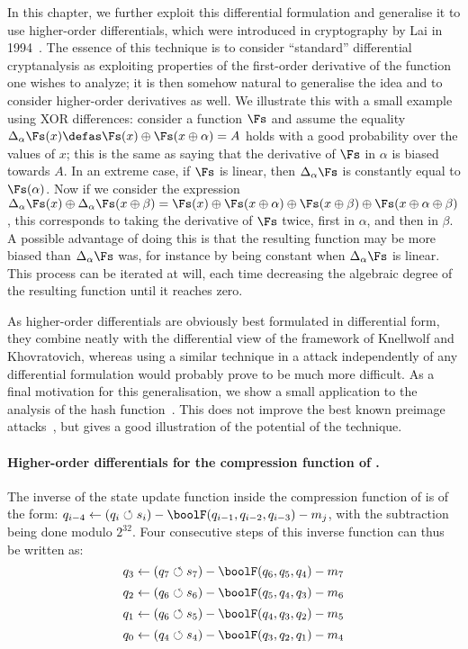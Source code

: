 In this chapter, we further exploit this differential formulation and generalise it to use higher-order
differentials, which were introduced in cryptography by Lai in 1994~\cite{L94}. The essence
of this technique is to consider ``standard'' differential cryptanalysis as exploiting properties
of the first-order derivative of the function one wishes to analyze; it is then somehow natural
to generalise the idea and to consider higher-order derivatives as well. We illustrate this
with a small example using XOR differences: consider a function $\Fs$ and
assume the equality $\Delta_\alpha\Fs(x) \defas \Fs(x) \oplus \Fs(x \oplus \alpha) = A$ holds with a good probability
over the values of $x$; this
is the same as saying that the derivative of $\Fs$ in $\alpha$ is biased towards $A$. In an extreme case,
if $\Fs$ is linear, then $\Delta_\alpha\Fs$ is constantly equal to $\Fs(\alpha)$.
Now if we consider the expression $\Delta_\alpha\Fs(x) \oplus \Delta_\alpha\Fs(x \oplus \beta) =
\Fs(x) \oplus \Fs(x \oplus \alpha) \oplus \Fs(x \oplus \beta)
\oplus \Fs(x \oplus \alpha \oplus \beta)$, this corresponds to taking the derivative of $\Fs$ twice,
first
in $\alpha$, and then in $\beta$. A possible advantage of doing this is that the resulting function may be more
biased than $\Delta_\alpha\Fs$ was, for instance by being constant when $\Delta_\alpha\Fs$ is linear.
This process can be iterated at will, each time decreasing the algebraic degree of the resulting
function until it reaches zero.

As higher-order differentials are obviously best formulated in differential form,
they combine neatly with the differential view of the framework of Knellwolf and Khovratovich, whereas
using a similar technique in a \mitm attack independently of any differential formulation would probably prove to be
much more difficult.
As a final motivation for this generalisation, we show a small application to
the analysis of the \mdfour hash function~\cite{Rivest-md4}. This does not improve the best known
preimage attacks~\cite{md4p2,md4p3}, but gives a good illustration of the potential of the technique.

\paragraph{Higher-order differentials for the compression function of \mdfour.}

The inverse of the state update function inside the compression function of \mdfour is of
the form: $q_{i-4} \leftarrow (q_i \circlearrowleft s_i) - \boolF(q_{i-1}, q_{i-2}, q_{i-3}) - m_j$,
with
the subtraction being done modulo $2^{32}$.
Four consecutive steps of this inverse function can thus be written as:
\[
q_3 \leftarrow (q_7 \circlearrowleft s_7) - \boolF(q_6, q_5, q_4) - m_7
\]
\[
q_2 \leftarrow (q_6 \circlearrowleft s_6) - \boolF(q_5, q_4, q_3) - m_6
\]
\[
q_1 \leftarrow (q_6 \circlearrowleft s_5) - \boolF(q_4, q_3, q_2) - m_5
\]
\[
q_0 \leftarrow (q_4 \circlearrowleft s_4) - \boolF(q_3, q_2, q_1) - m_4
\]

